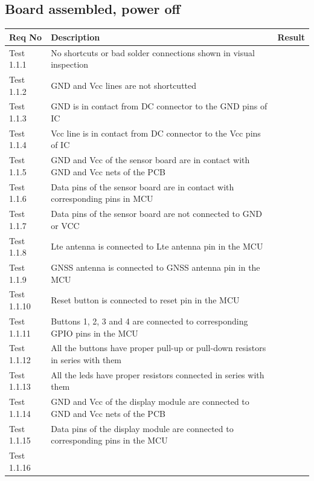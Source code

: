 \documentclass[]{dithesis}
\begin{document}
\subsection{Board assembled, power off}

\begin{tabular}{| m{2cm} | m{10cm} | m{2.5cm} |}
\hline
\textbf{Req No} & \textbf{Description} & \textbf{Result}  \\
\hline
Test 1.1.1 & No shortcuts or bad solder connections shown in visual \newline inspection &  \\
\hline
Test 1.1.2 & GND and Vcc lines are not shortcutted &   \\
\hline
Test 1.1.3 & GND is in contact from DC connector to the GND pins of IC &  \\
\hline
Test 1.1.4 & Vcc line is in contact from DC connector to the Vcc pins of IC & \\
\hline
Test 1.1.5 & GND and Vcc of the sensor board are in contact with GND and Vcc nets of the PCB & \\
\hline
Test 1.1.6 & Data pins of the sensor board are in contact with \newline corresponding pins in MCU & \\
\hline
Test 1.1.7 & Data pins of the sensor board are not connected to GND or VCC & \\
\hline
Test 1.1.8 & Lte antenna is connected to Lte antenna pin in the MCU & \\
\hline
Test 1.1.9 & GNSS antenna is connected to GNSS antenna pin in the MCU & \\
\hline
Test 1.1.10 & Reset button is connected to reset pin in the MCU & \\
\hline
Test 1.1.11 & Buttons 1, 2, 3 and 4 are connected to corresponding GPIO pins in the MCU & \\
\hline
Test 1.1.12 & All the buttons have proper pull-up or pull-down resistors in series with them & \\
\hline
Test 1.1.13 & All the leds have proper resistors connected in series with them & \\
\hline
Test 1.1.14 & GND and Vcc of the display module are connected to GND and Vcc nets of the PCB & \\
\hline
Test 1.1.15 & Data pins of the display module are connected to \newline corresponding pins in the MCU & \\
\hline
Test 1.1.16 & & \\
\hline
\end{tabular}
\end{document}
